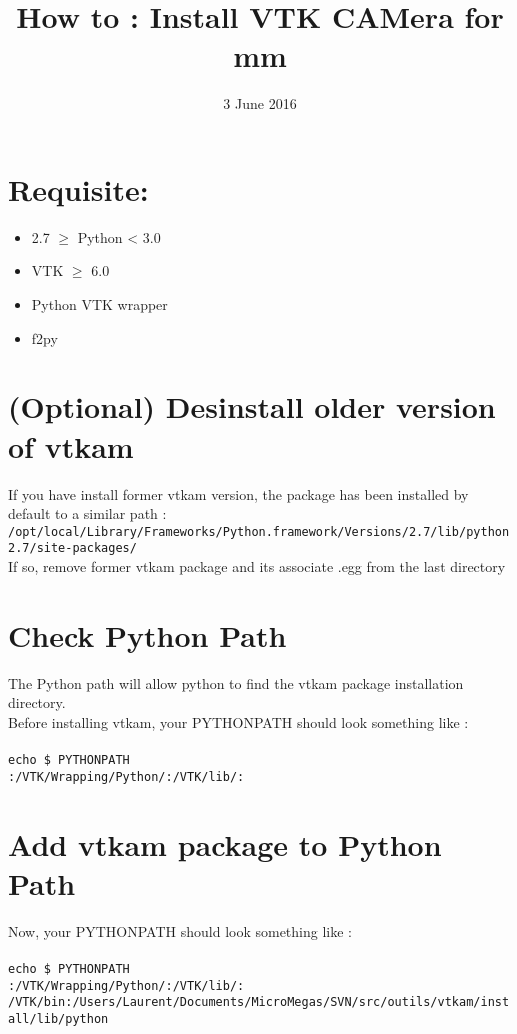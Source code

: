 \documentclass{article}
\title{How to : Install VTK CAMera for mm}
\date{3 June 2016}
\begin{document}
   \maketitle
   
\section*{Requisite:}
\begin{itemize}
\item 2.7 $\geq$ Python < 3.0 
\item VTK $\geq$ 6.0
\item Python VTK wrapper
\item f2py
\end{itemize}

  \tableofcontents

\section{(Optional) Desinstall older version of vtkam}

If you have install former vtkam version, the package has been installed by default to a similar path :
\\
\texttt{/opt/local/Library/Frameworks/Python.framework/Versions/2.7/lib/python2.7/site-packages/}
\\
If so, remove former vtkam package and its associate .egg from the last directory

\section{Check Python Path}

The Python path will allow python to find the vtkam package installation directory.
\\
Before installing vtkam, your PYTHONPATH should look something like :\\ \\
\texttt{echo \$ PYTHONPATH\\
:/VTK/Wrapping/Python/:/VTK/lib/:}

\section{Add vtkam package to Python Path}

Now, your PYTHONPATH should look something like :\\ \\
\texttt{echo \$ PYTHONPATH\\
:/VTK/Wrapping/Python/:/VTK/lib/:\\
/VTK/bin:/Users/Laurent/Documents/MicroMegas/SVN/src/outils/vtkam/install/lib/python}\\
\end{document}
